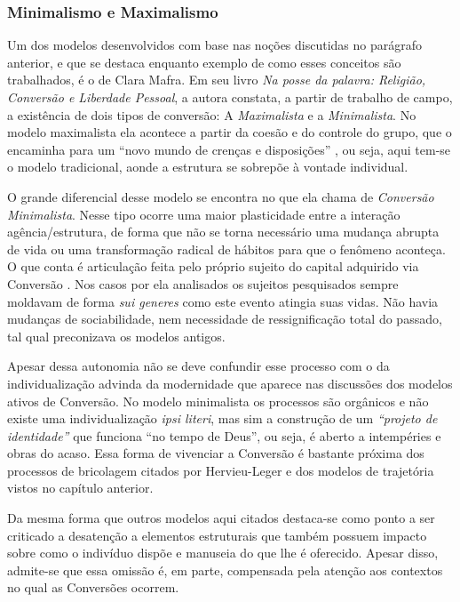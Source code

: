 \documentclass[
	12pt,				%
	oneside,			%
	a4paper,			%
	sumario=tradicional,
	english,			%
	brazil				%
	]{abntex2}
\begin{document}
\hypertarget{minimalismo-e-maximalismo}{%
\subsubsection{Minimalismo e Maximalismo}\label{minimalismo-e-maximalismo}}

Um dos modelos desenvolvidos com base nas noções discutidas no parágrafo anterior, e que se destaca enquanto exemplo de como esses conceitos são trabalhados, é o de Clara Mafra. Em seu livro \emph{Na posse da palavra: Religião, Conversão e Liberdade Pessoal}, a autora constata, a partir de trabalho de campo, a existência de dois tipos de conversão: A \emph{Maximalista} e a \emph{Minimalista}. No modelo maximalista ela acontece a partir da coesão e do controle do grupo, que o encaminha para um ``novo mundo de crenças e disposições'' \autocite{mafra_na_2018}, ou seja, aqui tem-se o modelo tradicional, aonde a estrutura se sobrepõe à vontade individual.

O grande diferencial desse modelo se encontra no que ela chama de \emph{Conversão Minimalista}. Nesse tipo ocorre uma maior plasticidade entre a interação agência/estrutura, de forma que não se torna necessário uma mudança abrupta de vida ou uma transformação radical de hábitos para que o fenômeno aconteça. O que conta é articulação feita pelo próprio sujeito do capital adquirido via Conversão \autocite{mafra_na_2018}. Nos casos por ela analisados os sujeitos pesquisados sempre moldavam de forma \emph{sui generes} como este evento atingia suas vidas. Não havia mudanças de sociabilidade, nem necessidade de ressignificação total do passado, tal qual preconizava os modelos antigos.

Apesar dessa autonomia não se deve confundir esse processo com o da individualização advinda da modernidade que aparece nas discussões dos modelos ativos de Conversão. No modelo minimalista os processos são orgânicos e não existe uma individualização \emph{ipsi literi}, mas sim a construção de um \emph{``projeto de identidade''} que funciona ``no tempo de Deus'', ou seja, é aberto a intempéries e obras do acaso. Essa forma de vivenciar a Conversão é bastante próxima dos processos de bricolagem citados por Hervieu-Leger e dos modelos de trajetória vistos no capítulo anterior.

Da mesma forma que outros modelos aqui citados destaca-se como ponto a ser criticado a desatenção a elementos estruturais que também possuem impacto sobre como o indivíduo dispõe e manuseia do que lhe é oferecido. Apesar disso, admite-se que essa omissão é, em parte, compensada pela atenção aos contextos no qual as Conversões ocorrem.
\end{document}
